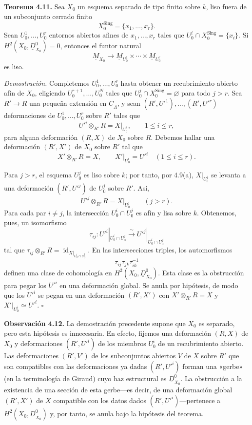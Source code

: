 
\medskip
\noindent\textbf{Teorema 4.11.}
Sea $X_0$ un esquema separado de tipo finito sobre $k$, liso fuera
de un subconjunto cerrado finito
\[
X_0^{\mathrm{Sing}}=\{x_1,\ldots,x_r\}.
\]
Sean $U_0^1,\ldots,U_0^r$ entornos abiertos afines de
$x_1,\ldots,x_r$ tales que
$U_0^i\cap X_0^{\mathrm{Sing}}=\{x_i\}$. Si
$H^2(X_0,\underline D^0_{X_0})=0$, entonces el funtor natural
\[
\underline M_{X_0}\longrightarrow
\underline M_{U_0^1}\times\cdots\times\underline M_{U_0^r}
\]
es liso.

\smallskip
\noindent\textit{Demostración.}
Completemos $U_0^1,\ldots,U_0^r$ hasta obtener un recubrimiento
abierto afín de $X_0$, eligiendo $U_0^{r+1},\ldots,U_0^N$ tales que
$U_0^j\cap X_0^{\mathrm{Sing}}=\varnothing$ para todo $j>r$.
Sea $R'\longrightarrow R$ una pequeña extensión en
$\underline C_\Lambda$, y sean
$(R',U'^1),\ldots,(R',U'^r)$ deformaciones de
$U_0^1,\ldots,U_0^r$ sobre $R'$ tales que
\[
U'^i\otimes_{R'}R=X|_{U_0^i},\qquad 1\leq i\leq r,
\]
para alguna deformación $(R,X)$ de $X_0$ sobre $R$. Debemos hallar
una deformación $(R',X')$ de $X_0$ sobre $R'$ tal que
\[
X'\otimes_{R'}R=X,
\qquad
X'|_{U_0^i}=U'^i\quad(1\leq i\leq r).
\]


Para $j>r$, el esquema $U_0^j$ es liso sobre $k$; por tanto, por
4.9(a), $X|_{U_0^j}$ se levanta a una deformación $(R',U'^j)$ de
$U_0^j$ sobre $R'$. Así,
\[
U'^j\otimes_{R'}R=X|_{U_0^j}\qquad(j>r).
\]
Para cada par $i\neq j$, la intersección $U_0^i\cap U_0^j$ es afín
y lisa sobre $k$. Obtenemos, pues, un isomorfismo
\[
\tau_{ij}:U'^i|_{U_0^i\cap U_0^j}
\xrightarrow{\ \sim\ }
U'^j|_{U_0^i\cap U_0^j}
\]
tal que
$\tau_{ij}\otimes_{R'}R=\operatorname{id}_{X|_{U_0^i\cap U_0^j}}$.
En las intersecciones triples, los automorfismos
\[
\tau_{ij}\tau_{jk}\tau_{ik}^{-1}
\]
definen una clase de cohomología en
$H^2(X_0,\underline D^0_{X_0})$. Esta clase es la obstrucción para
pegar los $U'^i$ en una deformación global. Se anula por hipótesis,
de modo que los $U'^i$ se pegan en una deformación $(R',X')$ con
$X'\otimes_{R'}R=X$ y $X'|_{U_0^i}\simeq U'^i$. \hfill$\square$

\medskip
\noindent\textbf{Observación 4.12.}
La demostración precedente supone que $X_0$ es separado, pero esta
hipótesis es innecesaria. En efecto, fijemos una deformación $(R,X)$
de $X_0$ y deformaciones $(R',U'^i)$ de los miembros $U_0^i$ de un
recubrimiento abierto. Las deformaciones $(R',V')$ de los
subconjuntos abiertos $V$ de $X$ sobre $R'$ que son compatibles con
las deformaciones ya dadas $(R',U'^i)$ forman una «gerbe» (en la
terminología de Giraud) cuyo haz estructural es
$\underline D^0_{X_0}$. La obstrucción a la existencia de una sección
de esta gerbe---es decir, de una deformación global $(R',X')$ de $X$
compatible con los datos dados $(R',U'^i)$---pertenece a
$H^2(X_0,\underline D^0_{X_0})$ y, por tanto, se anula bajo la
hipótesis del teorema.
